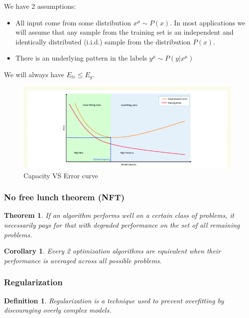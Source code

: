 \documentclass[11pt]{book} %
\newtheorem{theorem}{Theorem}[section]
\newtheorem{definition}{Definition}[section]
\newtheorem{corollary}{Corollary}[section]
\begin{document}
We have 2 assumptions:
\begin{itemize}
    \item All input come from some distribution $x^\mu \sim P(x)$. In most applications we will assume that any sample from the training set is an independent and identically distributed (i.i.d.) sample from the distribution $P(x)$.
    \item There is an underlying pattern in the labels $y^\mu \sim P(y|x^\mu)$
\end{itemize}
We will always have $E_{tr} \leq E_{g}$.

\begin{figure}
    \centering
    \includegraphics[width=\linewidth]{Figs/capacity-error-curve.png}
    \caption{Capacity VS Error curve}
    \label{fig:scenario1}
\end{figure}

\subsubsection{No free lunch theorem (NFT)}
\begin{theorem}
    If an algorithm performs well on a certain class of problems, it necessarily pays for that with degraded performance on the set of all remaining problems.
\end{theorem}
\begin{corollary}
    Every 2 optimization algorithms are equivalent when their performance is averaged across all possible problems.
\end{corollary}

\subsubsection{Regularization}
\begin{definition}
    Regularization is a technique used to prevent overfitting by discouraging overly complex models.
\end{definition}
\end{document}
